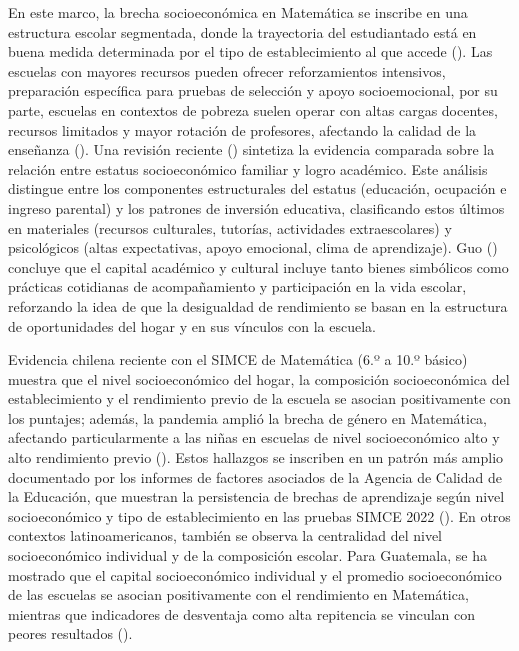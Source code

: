 \documentclass[
  spanish,
  a4paper,
  oneside]{scrbook}
\begin{document}
En este marco, la brecha socioeconómica en Matemática se inscribe en una
estructura escolar segmentada, donde la trayectoria del estudiantado
está en buena medida determinada por el tipo de establecimiento al que
accede (). Las escuelas con
mayores recursos pueden ofrecer reforzamientos intensivos, preparación
específica para pruebas de selección y apoyo socioemocional, por su
parte, escuelas en contextos de pobreza suelen operar con altas cargas
docentes, recursos limitados y mayor rotación de profesores, afectando
la calidad de la enseñanza ().
Una revisión reciente ()
sintetiza la evidencia comparada sobre la relación entre estatus
socioeconómico familiar y logro académico. Este análisis distingue entre
los componentes estructurales del estatus (educación, ocupación e
ingreso parental) y los patrones de inversión educativa, clasificando
estos últimos en materiales (recursos culturales, tutorías, actividades
extraescolares) y psicológicos (altas expectativas, apoyo emocional,
clima de aprendizaje). Guo ()
concluye que el capital académico y cultural incluye tanto bienes
simbólicos como prácticas cotidianas de acompañamiento y participación
en la vida escolar, reforzando la idea de que la desigualdad de
rendimiento se basan en la estructura de oportunidades del hogar y en
sus vínculos con la escuela.

Evidencia chilena reciente con el SIMCE de Matemática (6.º a 10.º
básico) muestra que el nivel socioeconómico del hogar, la composición
socioeconómica del establecimiento y el rendimiento previo de la escuela
se asocian positivamente con los puntajes; además, la pandemia amplió la
brecha de género en Matemática, afectando particularmente a las niñas en
escuelas de nivel socioeconómico alto y alto rendimiento previo
(). Estos hallazgos se inscriben en un patrón más amplio documentado
por los informes de factores asociados de la Agencia de Calidad de la
Educación, que muestran la persistencia de brechas de aprendizaje según
nivel socioeconómico y tipo de establecimiento en las pruebas SIMCE 2022
(). En otros contextos latinoamericanos, también se
observa la centralidad del nivel socioeconómico individual y de la
composición escolar. Para Guatemala, se ha mostrado que el capital
socioeconómico individual y el promedio socioeconómico de las escuelas
se asocian positivamente con el rendimiento en Matemática, mientras que
indicadores de desventaja como alta repitencia se vinculan con peores
resultados ().
\end{document}
